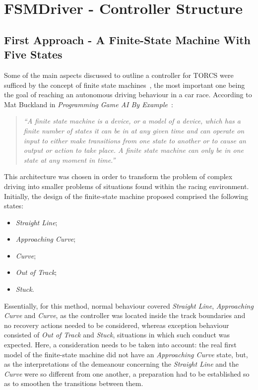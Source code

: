 \section{\textbf{FSMDriver - Controller Structure}} \label{sec:fsm}

	\subsection{First Approach - A Finite-State Machine With Five States}
	
	Some of the main aspects discussed to outline a controller for TORCS were sufficed by the concept of finite state
	machines~\cite{FSM}, the most important one being the goal of reaching an autonomous driving behaviour in a car
	race. According to Mat Buckland in \emph{Programming Game AI By Example}~\cite{AI}:
	
	\begin{quotation}
		
		\emph{
		``A finite state machine is a device, or a model of a device, which has a finite number of states it can be in
		at any given time and can operate on input to either make transitions from one state to another or to cause
		an output or action to take place. A finite state machine can only be in one state at any moment in time.''}
		
	\end{quotation}
	
	This architecture was chosen in order to transform the problem of complex driving into smaller problems of
	situations found within the racing environment. Initially, the design of the finite-state machine proposed
	comprised the following states:
	
	\begin{itemize}

	\item \emph{Straight Line};
	\item \emph{Approaching Curve};
	\item \emph{Curve};
	\item \emph{Out of Track};
	\item \emph{Stuck}.

	\end{itemize}
	
	Essentially, for this method, normal behaviour covered \emph{Straight Line}, \emph{Approaching Curve} and
	\emph{Curve}, as the controller was located inside the track boundaries and no recovery actions needed to be
	considered, whereas exception behaviour consisted of \emph{Out of Track} and \emph{Stuck}, situations in which
	such conduct was expected. Here, a consideration needs to be taken into account: the real first model of the
	finite-state machine did not have an \emph{Approaching Curve} state, but, as the interpretations of the demeanour
	concerning the \emph{Straight Line} and the \emph{Curve} were so different from one another, a preparation had to
	be established so as to smoothen the transitions between them.
	
